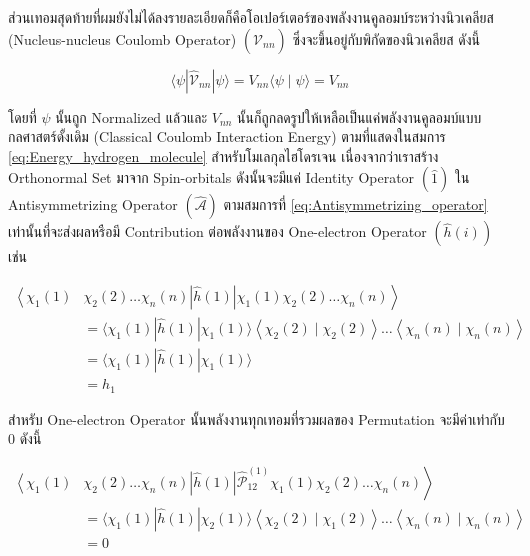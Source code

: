 ส่วนเทอมสุดท้ายที่ผมยังไม่ได้ลงรายละเอียดก็คือโอเปอร์เตอร์ของพลังงานคูลอมบ์ระหว่างนิวเคลียส (Nucleus-nucleus Coulomb Operator) 
$(\hat{\mathscr{V}}_{n n})$ ซึ่งจะขึ้นอยู่กับพิกัดของนิวเคลียส ดังนี้

\begin{equation}
    \langle\psi|\hat{\mathscr{V}}_{n n}| \psi\rangle 
    = V_{n n}\langle\psi \mid \psi\rangle 
    = V_{n n}
\end{equation}

\noindent โดยที่ $\psi$ นั้นถูก Normalized แล้วและ $V_{n n}$ นั้นก็ถูกลดรูปให้เหลือเป็นแค่พลังงานคูลอมบ์แบบกลศาสตร์ดั้งเดิม 
(Classical Coulomb Interaction Energy) ตามที่แสดงในสมการ \ref{eq:Energy_hydrogen_molecule} สำหรับโมเลกุลไฮโดรเจน 
เนื่องจากว่าเราสร้าง Orthonormal Set มาจาก Spin-orbitals ดังนั้นจะมีแค่ Identity Operator $(\hat{1})$ ใน Antisymmetrizing 
Operator $(\hat{\mathscr{A}})$ ตามสมการที่ \ref{eq:Antisymmetrizing_operator} เท่านั้นที่จะส่งผลหรือมี Contribution 
ต่อพลังงานของ One-electron Operator $(\hat{h}(i))$ เช่น 

\begin{equation}
    \begin{aligned}
        \left\langle \right. \chi_1(1) & \chi_2(2) \dots \chi_n(n)
            |\hat{h}(1)| 
            \chi_1(1) \chi_2(2) \dots \chi_n(n) \left. \right\rangle \\
        & = \langle\chi_1(1)
            |\hat{h}(1)| 
            \chi_1(1)\rangle\left\langle\chi_2(2) \mid \chi_2(2)\right\rangle 
            \dots\left\langle\chi_n(n) \mid \chi_n(n)\right\rangle \\
        & = \langle\chi_1(1)
            |\hat{h}(1)| 
            \chi_1(1)\rangle \\
        & = h_1
    \end{aligned}
\end{equation}

\noindent สำหรับ One-electron Operator นั้นพลังงานทุกเทอมที่รวมผลของ Permutation จะมีค่าเท่ากับ 0 ดังนี้

\begin{equation}
    \begin{aligned}
        \left\langle \right. \chi_1(1) & \chi_2(2) \dots \chi_n(n)
            |\hat{h}(1)| 
            \hat{\mathscr{P}}_{12}^{(1)} \chi_1(1) \chi_2(2) \dots \chi_n(n) \left. \right\rangle \\
        & = \langle\chi_1(1)
            |\hat{h}(1)| 
            \chi_2(1)\rangle\left\langle\chi_2(2) \mid \chi_1(2)\right\rangle 
            \dots\left\langle\chi_n(n) \mid \chi_n(n)\right\rangle \\ 
        & = 0
    \end{aligned}
\end{equation}


